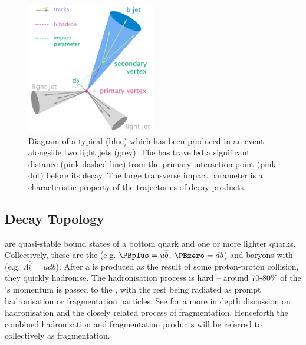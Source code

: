 \begin{figure}[!tbp]
  \centering
  \includegraphics[width=0.5\textwidth]{chapters/3.tracking/figs/b-jet-diagram.png}
  \caption{
    Diagram of a typical \bjet (blue) which has been produced in an event alongside two light jets (grey).
    The \bhadron has travelled a significant distance (pink dashed line) from the primary interaction point (pink dot) before its decay.
    The large transverse impact parameter \dzero is a characteristic property of the trajectories of \bhadron decay products.}
  \label{fig:bjet_diagram}
\end{figure}

\subsection{Decay Topology}
\label{sec:b_decay_topology}

\bhadrons are quasi-stable bound states of a bottom quark and one or more lighter quarks.
Collectively, these are the \bmesons (e.g. $\PBplus = u \overline{b}$, $\PBzero = d \overline{b}$) and baryons with (e.g. $\Lambda_b^0 = udb$).
After a \bquark is produced as the result of some proton-proton collision, they quickly hadronise.
The hadronisation process is hard -- around 70-80\% of the \bquark's momentum is passed to the \bhadron, with the rest being radiated as prompt hadronisation or fragmentation particles.
See  for a more in depth discussion on hadronisation and the closely related process of fragmentation.
Henceforth the combined hadronisation and fragmentation products will be referred to collectively as fragmentation.

